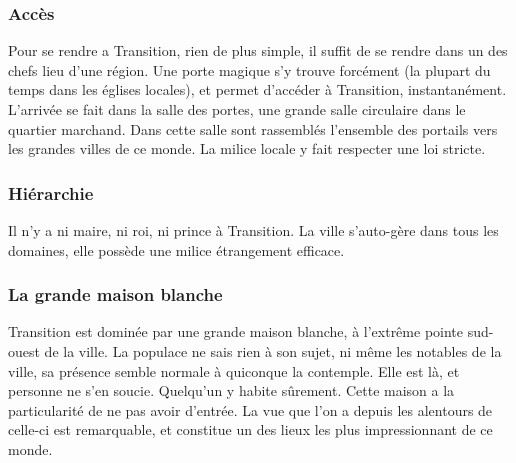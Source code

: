 \subsubsection{Accès}
Pour se rendre a Transition, rien de plus simple, il suffit de se rendre dans un des chefs lieu d'une région. Une porte magique s'y trouve forcément (la plupart du temps dans les églises locales), et permet d'accéder à Transition, instantanément.
L'arrivée se fait dans la salle des portes, une grande salle circulaire dans le quartier marchand. Dans cette salle sont rassemblés l'ensemble des portails vers les grandes villes de ce monde. La milice locale y fait respecter une loi stricte.
\subsubsection{Hiérarchie}
Il n'y a ni maire, ni roi, ni prince à Transition. La ville s'auto-gère dans tous les domaines, elle possède une milice étrangement efficace.
\subsubsection{La grande maison blanche}
Transition est dominée par une grande maison blanche, à l’extrême pointe sud-ouest de la ville. La populace ne sais rien à son sujet, ni même les notables de la ville, sa présence semble normale à quiconque la contemple. Elle est là, et personne ne s'en soucie. Quelqu'un y habite sûrement. Cette maison a la particularité de ne pas avoir d'entrée. La vue que l'on a depuis les alentours de celle-ci est remarquable, et constitue un des lieux les plus impressionnant de ce monde.